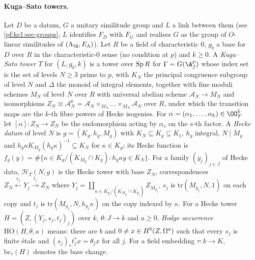 \paragraph{Kuga--Sato towers.} Let $D$ be a datum, $G$ a unitary similitude group and $L$ a link between them (see
\cref{pf:ks1:sec-groups}; $L$ identifies $F_D$ with $F_G$ and realises $G$ as the group of $O$-linear similitudes of
$(\Lambda_\Q,E_\Lambda)$). Let $R$ be a field of characteristic $0$, $g_b$ a base for $D$ over $R$ in the
characteristic-$0$ sense (no condition at $p$) and $k\ge0$. A \emph{Kuga--Sato tower} $T$ for $(L,g_b,k)$ is a tower over
$\ksoneSp R$ for $\Gamma=G(\ksoneAfp)$ whose index set is the set of levels $N\ge3$ prime to $p$, with $K_N$ the principal
congruence subgroup of level $N$ and $\Delta$ the monoid of integral elements, together with fine moduli schemes $M_N$ of
level $N$ over $R$ with universal abelian scheme $\mathcal A_N\to M_N$ and isomorphisms
$Z_N\cong\mathcal A_N^k=\mathcal A_N\times_{M_N}\dots\times_{M_N}\mathcal A_N$ over $R$, under which the transition maps are the
$k$-th fibre powers of Hecke isogenies. For $\alpha=(\alpha_1,\dots,\alpha_k)\in\OO_F^k$ let $[\alpha]:Z_N\to Z_N$ be the
endomorphism acting by $\alpha_s$ on the $s$-th factor. A \emph{Hecke datum} of level $N$ is $g=(K_g,h_g,M_g)$ with
$K_N\subseteq K_g\subseteq K_1$, $h_g$ integral, $N\mid M_g$ and $h_g\kappa K_{M_g}(h_g\kappa)^{-1}\subseteq K_N$ for
$\kappa\in K_g$; its Hecke function is $f_g(y)=\#\{\kappa\in K_g/(K_{M_g}\cap K_g):h_g\kappa y\in K_N\}$. For a family
$(g_j)_{j\in J}$ of Hecke data, $\mathcal H_T(N,g)$ is the Hecke tower with base $Z_N$, correspondences
$Z_N\xleftarrow{s_j}Y_j\xrightarrow{t_j}Z_N$ where $Y_j=\coprod_{\kappa\in K_{g_j}/(K_{M_{g_j}}\cap K_{g_j})}Z_{M_{g_j}}$,
$s_j$ is $\mathrm{tr}(M_{g_j},N,1)$ on each copy and $t_j$ is $\mathrm{tr}(M_{g_j},N,h_{g_j}\kappa)$ on the copy indexed by
$\kappa$. For a Hecke tower $H=(Z,(Y_j,s_j,t_j)_j)$ over $k$, $\theta:J\to k$ and $a\ge0$, \emph{Hodge occurrence} $\mathrm{HO}(H,\theta,a)$ means:
there are $b$ and $0\neq x\in\ksoneH{Z}{a}{b}$ such that every $s_j$ is finite \'etale and $(s_j)_*t_j^*x=\theta_jx$ for all
$j$. For a field embedding $\tau:k\to K$, $\mathrm{bc}_\tau(H)$ denotes the base change.

